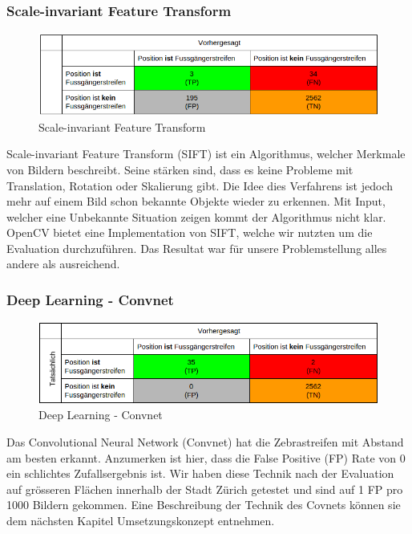 \subsubsection{Scale-invariant Feature Transform}	
\begin{figure}[H]
\includegraphics[width=\textwidth]{images/sif_conf.png}
\caption[Scale-invariant Feature Transform]{Scale-invariant Feature Transform}
\end{figure}
Scale-invariant Feature Transform (SIFT) ist ein Algorithmus, welcher Merkmale von Bildern beschreibt. Seine stärken sind, dass es keine Probleme mit Translation, Rotation oder Skalierung gibt. Die Idee dies Verfahrens ist jedoch mehr auf einem Bild schon bekannte Objekte wieder zu erkennen. Mit Input, welcher eine Unbekannte Situation zeigen kommt der Algorithmus nicht klar.\\
OpenCV bietet eine Implementation von SIFT, welche wir nutzten um die Evaluation durchzuführen. Das Resultat war für unsere Problemstellung alles andere als ausreichend.
\subsubsection{Deep Learning - Convnet}	
\begin{figure}[H]
\includegraphics[width=\textwidth]{images/deep_conf.png}
\caption[Deep Learning]{Deep Learning - Convnet}
\end{figure}
Das Convolutional Neural Network (Convnet) hat die Zebrastreifen mit Abstand am besten erkannt. Anzumerken ist hier, dass die False Positive (FP) Rate von 0 ein schlichtes Zufallsergebnis ist. Wir haben diese Technik nach der Evaluation auf grösseren Flächen innerhalb der Stadt Zürich getestet und sind auf 1 FP pro 1000 Bildern gekommen. Eine Beschreibung der Technik des Covnets können sie dem nächsten Kapitel Umsetzungskonzept entnehmen.
\newpage

